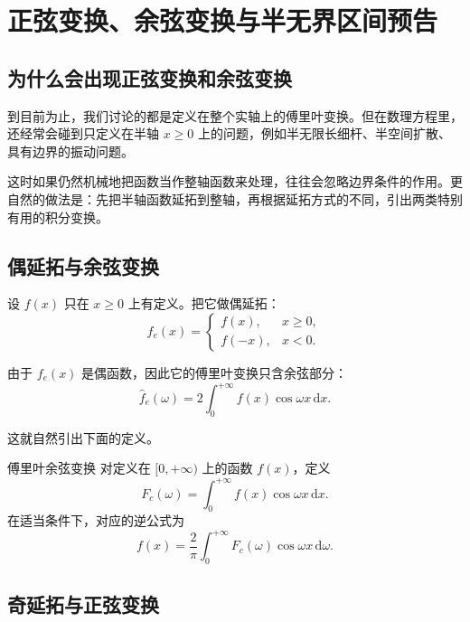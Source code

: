 \section{正弦变换、余弦变换与半无界区间预告}

\subsection{为什么会出现正弦变换和余弦变换}

到目前为止，我们讨论的都是定义在整个实轴上的傅里叶变换。但在数理方程里，还经常会碰到只定义在半轴 $x\ge 0$ 上的问题，例如半无限长细杆、半空间扩散、具有边界的振动问题。

这时如果仍然机械地把函数当作整轴函数来处理，往往会忽略边界条件的作用。更自然的做法是：先把半轴函数延拓到整轴，再根据延拓方式的不同，引出两类特别有用的积分变换。

\subsection{偶延拓与余弦变换}

设 $f(x)$ 只在 $x\ge 0$ 上有定义。把它做偶延拓：
\begin{equation}
    f_e(x)=
    \begin{cases}
        f(x), & x\ge 0, \\
        f(-x), & x<0.
    \end{cases}
\end{equation}

由于 $f_e(x)$ 是偶函数，因此它的傅里叶变换只含余弦部分：
\begin{equation}
    \hat{f}_e(\omega)
    =
    2\int_0^{+\infty} f(x)\cos \omega x\,\mathrm{d}x.
\end{equation}

这就自然引出下面的定义。

\begin{dingliyi}{傅里叶余弦变换}{}
对定义在 $[0,+\infty)$ 上的函数 $f(x)$，定义
\begin{equation}
    F_c(\omega)=\int_0^{+\infty} f(x)\cos \omega x\,\mathrm{d}x.
\end{equation}
在适当条件下，对应的逆公式为
\begin{equation}
    f(x)=\frac{2}{\pi}\int_0^{+\infty} F_c(\omega)\cos \omega x\,\mathrm{d}\omega.
\end{equation}
\end{dingliyi}

\subsection{奇延拓与正弦变换}

